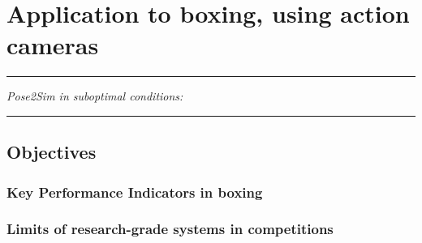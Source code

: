 
\lhead[\fancyplain{}{\leftmark}]%
      {\fancyplain{}{}} %
\chead[\fancyplain{}{}]%
      {\fancyplain{}{}}
\rhead[\fancyplain{}{}]%
      {\fancyplain{}{\rightmark}}%
\lfoot[\fancyplain{}{}]%
      {\fancyplain{}{}}
\cfoot[\fancyplain{}{\thepage}]%
      {\fancyplain{}{\thepage}} %
\rfoot[\fancyplain{}{}]%
     {\fancyplain{}{\scriptsize}}



\chapter{Application to boxing, using action cameras}
\label{ch:6}


\begin{center}
\rule{0.7\linewidth}{.5pt}
\begin{minipage}{0.7\linewidth}
\smallskip

\textit{Pose2Sim in suboptimal conditions: 
}

\end{minipage}
\smallskip
\rule{0.7\linewidth}{.5pt}
\end{center}

\minitoc
\newpage


\section{Objectives}
\subsection{Key Performance Indicators in boxing}
\blindtext

\subsection{Limits of research-grade systems in competitions}
\blindtext

